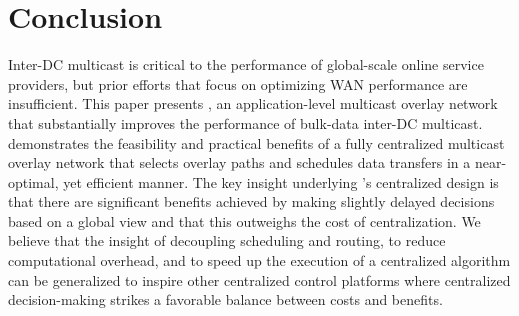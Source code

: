 \section{Conclusion}
Inter-DC multicast is critical to the performance of
global-scale online service providers, but
prior efforts that focus
on optimizing WAN performance are insufficient.
This paper presents \name,
an application-level multicast overlay network that substantially
improves the performance of
bulk-data inter-DC multicast.
\name demonstrates the feasibility
and practical benefits of a fully centralized multicast overlay
network that selects overlay paths and schedules data transfers
in a near-optimal, yet efficient manner.
The key insight underlying \name's centralized design is
that there are significant benefits achieved by making slightly delayed
decisions based on a global view and that this outweighs the cost of
centralization. %
We believe that the insight of decoupling scheduling and routing, to
reduce computational overhead, and to speed up the execution of a centralized algorithm
can be generalized to inspire other centralized control platforms
where centralized decision-making strikes
a favorable balance between costs and benefits.

